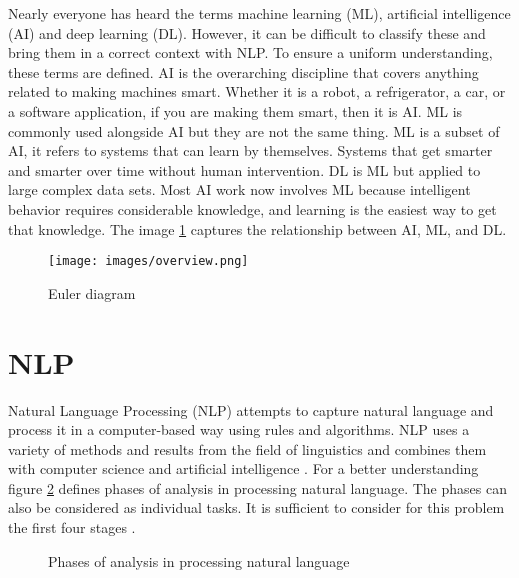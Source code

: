 Nearly everyone has heard the terms machine learning (ML), artificial intelligence (AI) and deep learning (DL). However, it can be difficult to classify these and bring them in a correct context with NLP. To ensure a uniform understanding, these terms are defined. 
AI is the overarching discipline that covers anything related to making machines smart. Whether it is a robot, a refrigerator, a car, or a software application, if you are making them smart, then it is AI. ML is commonly used alongside AI but they are not the same thing. ML is a subset of AI, it refers to systems that can learn by themselves. Systems that get smarter and smarter over time without human intervention. DL is ML but applied to large complex data sets. Most AI work now involves ML because intelligent behavior requires considerable knowledge, and learning is the easiest way to get that knowledge. The image \ref{fig:overview} captures the relationship between AI, ML, and DL.

\begin{figure}[h]
    \centering
    \texttt{[image: images/overview.png]}
    \caption{Euler diagram}
    \label{fig:overview}
\end{figure}

\section{NLP}
Natural Language Processing (NLP) attempts to capture natural language and process it in a computer-based way using rules and algorithms. NLP uses a variety of methods and results from the field of linguistics and combines them with computer science and artificial intelligence \parencite{liddy2001natural}.
For a better understanding figure \ref{fig:phases} defines phases of analysis in processing natural language. The phases can also be considered as individual tasks. It is sufficient to consider for this problem the first four stages \parencite{indurkhya2010handbook}.
  
\begin{figure}[h]
    \centering
    \resizebox{1\textwidth}{!}{
    
    }
    \caption{Phases of analysis in processing natural language}
    \label{fig:phases}
\end{figure}

